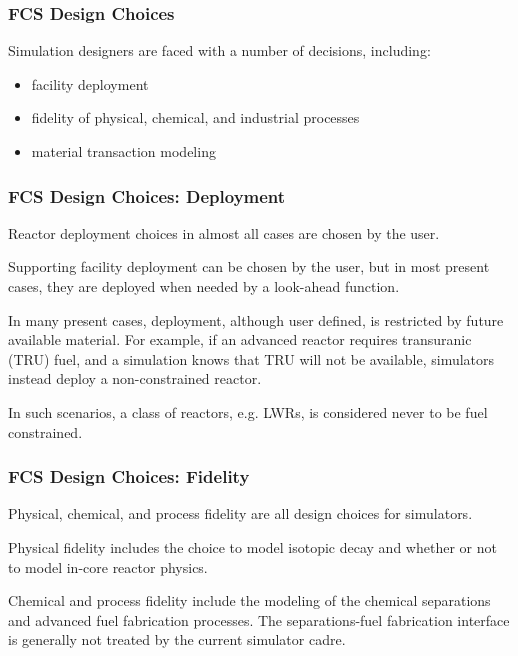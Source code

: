 \begin{frame}[ctb!]
  \frametitle{FCS Design Choices}
  Simulation designers are faced with a number of decisions, including:
  \begin{itemize}
    \item facility deployment
    \item fidelity of physical, chemical, and industrial processes
    \item material transaction modeling
  \end{itemize}
\end{frame}

\begin{frame}[ctb!]
  \frametitle{FCS Design Choices: Deployment}

  Reactor deployment choices in almost all cases are chosen by the user.\vspace{0.2cm}

  Supporting facility deployment can be chosen by the user, but in most present
  cases, they are deployed when needed by a look-ahead function.\vspace{0.2cm}

  In many present cases, deployment, although user defined, is restricted by
  future available material. For example, if an advanced reactor requires
  transuranic (TRU) fuel, and a simulation knows that TRU will not be available,
  simulators instead deploy a non-constrained reactor.\vspace{0.2cm}

  In such scenarios, a class of reactors, e.g. LWRs, is considered never to be
  fuel constrained.
\end{frame}

\begin{frame}[ctb!]
  \frametitle{FCS Design Choices: Fidelity}

  Physical, chemical, and process fidelity are all design choices for simulators.\vspace{0.2cm}

  Physical fidelity includes the choice to model isotopic decay and whether or
  not to model in-core reactor physics.\vspace{0.2cm}

  Chemical and process fidelity include the modeling of the chemical separations
  and advanced fuel fabrication processes. The separations-fuel fabrication
  interface is generally not treated by the current simulator cadre.
\end{frame}

